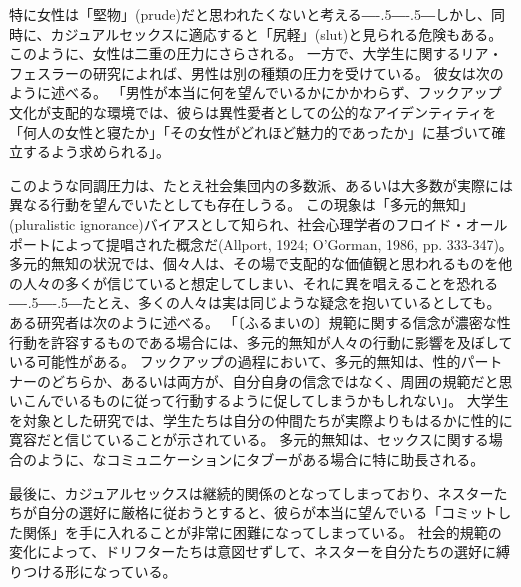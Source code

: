 \documentclass[paper=a4,book,openany]{jlreq}
\def\DDASH{―\kern-.5\zw―\kern-.5\zw―} %
\begin{document}
特に女性は「堅物」(prude)だと思われたくないと考える{\DDASH}しかし、同時に、カジュアルセックスに適応すると「尻軽」(slut)と見られる危険もある。
このように、女性は二重の圧力にさらされる。
一方で、大学生に関するリア・フェスラーの研究によれば、男性は別の種類の圧力を受けている。
彼女は次のように述べる。
「男性が本当に何を望んでいるかにかかわらず、フックアップ文化が支配的な環境では、彼らは異性愛者としての公的なアイデンティティを「何人の女性と寝たか」「その女性がどれほど魅力的であったか」に基づいて確立するよう求められる」\citep{fessler16:_lot_women_dont}。

このような同調圧力は、たとえ社会集団内の多数派、あるいは大多数が実際には異なる行動を望んでいたとしても存在しうる。
この現象は「多元的無知」(pluralistic ignorance)バイアスとして知られ、社会心理学者のフロイド・オールポートによって提唱された概念だ(Allport, 1924; O'Gorman, 1986, pp. 333-347)。
\nocite{allport24:_social_psyc,ogorman86:_disc_plur_ignor}多元的無知の状況では、個々人は、その場で支配的な価値観と思われるものを他の人々の多くが信じていると想定してしまい、それに異を唱えることを恐れる{\DDASH}たとえ、多くの人々は実は同じような疑念を抱いているとしても。
ある研究者は次のように述べる。
「〔ふるまいの〕規範に関する信念が濃密な性行動を許容するものである場合には、多元的無知が人々の行動に影響を及ぼしている可能性がある。
フックアップの過程において、多元的無知は、性的パートナーのどちらか、あるいは両方が、自分自身の信念ではなく、周囲の規範だと思いこんでいるものに従って行動するように促してしまうかもしれない」\citep[p. 130]{griggs03:_plur_ignor_hook_up}。
大学生を対象とした研究では、学生たちは自分の仲間たちが実際よりもはるかに性的に寛容だと信じていることが示されている\citep{chia06:_how_media_cont,reiber10:_hook_up}。
多元的無知は、セックスに関する場合のように、なコミュニケーションにタブーがある場合に特に助長される。

最後に、カジュアルセックスは継続的関係のとなってしまっており、ネスターたちが自分の選好に厳格に従おうとすると、彼らが本当に望んでいる「コミットした関係」を手に入れることが非常に困難になってしまっている。
社会的規範の変化によって、ドリフターたちは意図せずして、ネスターを自分たちの選好に縛りつける形になっている。
\end{document}
